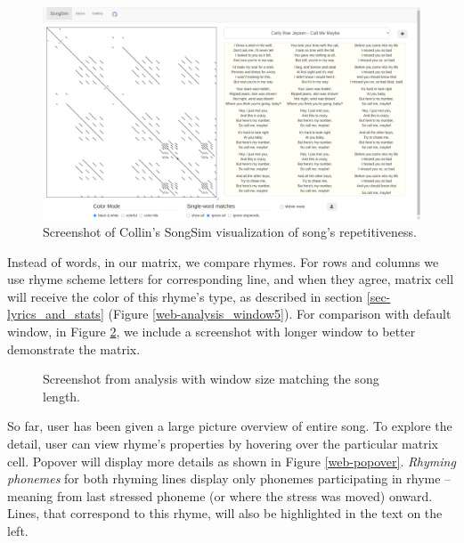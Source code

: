 \begin{figure}[h]\centering
	\includegraphics[scale=0.2]{../img/songsim.png}
	\caption{Screenshot of Collin's SongSim visualization of song's repetitiveness.}
	\label{songsim}
\end{figure}

Instead of words, in our matrix, we compare rhymes. For rows and columns we use rhyme scheme letters for corresponding line, and when they agree, matrix cell will receive the color of this rhyme's type, as described in section \ref{sec-lyrics_and_stats} (Figure \ref{web-analysis_window5}). For comparison with default window, in Figure \ref{web-analysis_window_all}, we include a screenshot with longer window to better demonstrate the matrix.


\begin{figure}[h]\centering
	\caption{Screenshot from analysis with window size matching the song length.}
	\label{web-analysis_window_all}
\end{figure}

So far, user has been given a large picture overview of entire song. To explore the detail, user can view rhyme's properties by hovering over the particular matrix cell. Popover will display more details as shown in Figure \ref{web-popover}. \textit{Rhyming phonemes} for both rhyming lines display only phonemes participating in rhyme -- meaning from last stressed phoneme (or where the stress was moved) onward. Lines, that correspond to this rhyme, will also be highlighted in the text on the left. 

